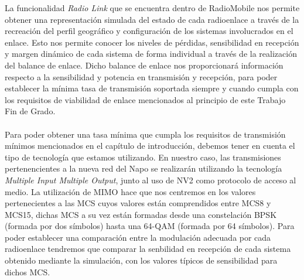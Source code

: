	La funcionalidad \textit{Radio Link} que se encuentra dentro de RadioMobile nos permite obtener una representación simulada del estado de cada radioenlace a través de la recreación del perfil geográfico y configuración de los sistemas involucrados en el enlace. Esto nos permite conocer los niveles de pérdidas, sensibilidad en recepción y margen dinámico de cada sistema de forma individual a través de la realización del balance de enlace. Dicho balance de enlace nos proporcionará información respecto a la sensibilidad y potencia en transmisión y recepción, para poder establecer la mínima tasa de transmisión soportada siempre y cuando cumpla con los requisitos de viabilidad de enlace mencionados al principio de este Trabajo Fin de Grado.\\\\
	
	Para poder obtener una tasa mínima que cumpla los requisitos de transmisión mínimos mencionados en el capítulo de introducción, debemos tener en cuenta el tipo de tecnología que estamos utilizando. En nuestro caso, las transmisiones pertenencientes a la nueva red del Napo se realizarán utilizando la tecnología \textit{Multiple Input Multiple Output}, junto al uso de NV2 como protocolo de acceso al medio. La utilización de MIMO hace que nos centremos en los valores pertenecientes a las MCS cuyos valores están comprendidos entre MCS8 y MCS15, dichas MCS a su vez están formadas desde una constelación BPSK (formada por dos símbolos) hasta una 64-QAM (formada por 64 símbolos). Para poder establecer una comparación entre la modulación adecuada por cada radioenlace tendremos que comparar la senbilidad en recepción de cada sistema obtenido mediante la simulación, con los valores típicos de sensibilidad para dichos MCS.\\
	
